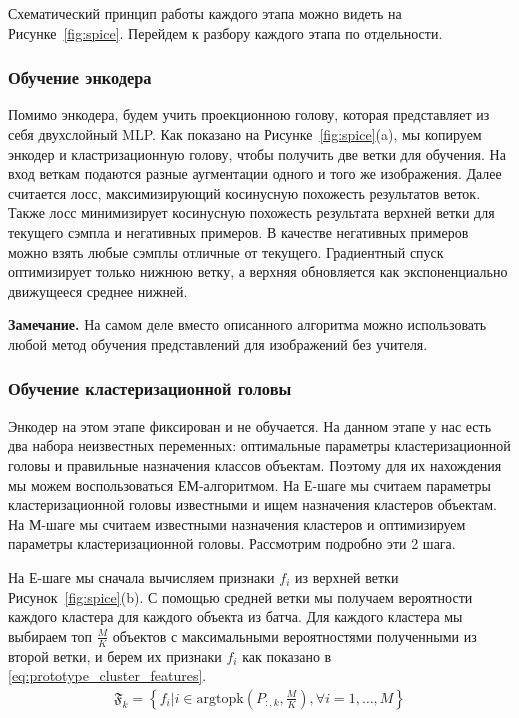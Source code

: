 \documentclass[a4paper,12pt]{extarticle}
\begin{document}
Схематический принцип работы каждого этапа можно видеть 
на Рисунке~\ref{fig:spice}. Перейдем к разбору каждого этапа
по отдельности.

\subsubsection{Обучение энкодера}

Помимо энкодера, будем учить проекционною голову, которая 
представляет из себя двухслойный MLP. Как показано на 
Рисунке~\ref{fig:spice}(a), мы копируем энкодер и 
кластризационную голову, чтобы получить две ветки 
для обучения. На вход веткам подаются разные аугментации 
одного и того же изображения. Далее считается
лосс, максимизирующий косинусную похожесть результатов веток. 
Также лосс минимизирует косинусную похожесть результата 
верхней ветки для текущего сэмпла и негативных примеров. 
В качестве негативных примеров можно взять любые сэмплы 
отличные от текущего.
Градиентный спуск оптимизирует только нижнюю ветку, 
а верхняя обновляется 
как экспоненциально движущееся среднее нижней. 

\textbf{Замечание.} На самом деле вместо описанного 
алгоритма можно использовать любой метод обучения представлений
для изображений без учителя.

\subsubsection{Обучение кластеризационной головы}

Энкодер на этом этапе фиксирован и не обучается. 
На данном этапе у нас есть два набора неизвестных переменных:
оптимальные параметры кластеризационной головы и правильные назначения 
классов объектам. Поэтому для их нахождения мы можем воспользоваться ЕМ-алгоритмом.
На Е-шаге мы считаем параметры кластеризационной головы известными 
и ищем назначения кластеров объектам. На М-шаге мы
считаем известными назначения кластеров и оптимизируем параметры 
кластеризационной головы. Рассмотрим подробно эти 2 шага.

На Е-шаге мы сначала вычисляем признаки $f_i$ из 
верхней ветки Рисунок~\ref{fig:spice}(b). С помощью 
средней ветки мы получаем вероятности каждого кластера для 
каждого объекта из батча. Для каждого кластера мы выбираем 
топ $\frac{M}{K}$ объектов с максимальными 
вероятностями полученными из второй ветки, и берем их признаки
$f_i$ как показано в \ref{eq:prototype_cluster_features}.
\begin{align}\label{eq:prototype_cluster_features}
	\mathfrak{F}_k=\left\{f_i\Big\vert i\in\text{argtopk}\left(P_{:,k}, \frac{M}{K}\right), 
	\forall i=1, \ldots, M \right\}
\end{align}
\end{document}
